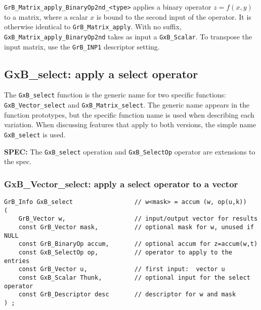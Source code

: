 \documentclass[12pt]{article}
\begin{document}
\verb'GrB_Matrix_apply_BinaryOp2nd_<type>'  applies a binary operator
$z=f(x,y)$ to a matrix, where a scalar $x$ is bound to the second input of the
operator.  It is otherwise identical to \verb'GrB_Matrix_apply'.  With no
suffix, \verb'GxB_Matrix_apply_BinaryOp2nd' takes as input a \verb'GxB_Scalar'. 
To transpose the input matrix, use the \verb'GrB_INP1' descriptor setting.

\newpage
\subsection{{\sf GxB\_select:} apply a select operator} %
\label{select}

The \verb'GxB_select' function is the generic name for two specific functions:
\\ \verb'GxB_Vector_select' and  \verb'GxB_Matrix_select'.  The generic name
appears in the function prototypes, but the specific function name is used when
describing each variation.  When discussing features that apply to both
versions, the simple name \verb'GxB_select' is used.

\begin{spec}
{\bf SPEC:} The \verb'GxB_select' operation and \verb'GxB_SelectOp' operator
are extensions to the spec.
\end{spec}

\subsubsection{{\sf GxB\_Vector\_select:} apply a select operator to a vector}
\label{select_vector}

\begin{mdframed}[userdefinedwidth=6in]
{\footnotesize
\begin{verbatim}
GrB_Info GxB_select                 // w<mask> = accum (w, op(u,k))
(
    GrB_Vector w,                   // input/output vector for results
    const GrB_Vector mask,          // optional mask for w, unused if NULL
    const GrB_BinaryOp accum,       // optional accum for z=accum(w,t)
    const GxB_SelectOp op,          // operator to apply to the entries
    const GrB_Vector u,             // first input:  vector u
    const GxB_Scalar Thunk,         // optional input for the select operator
    const GrB_Descriptor desc       // descriptor for w and mask
) ;
\end{verbatim} } \end{mdframed}
\end{document}
